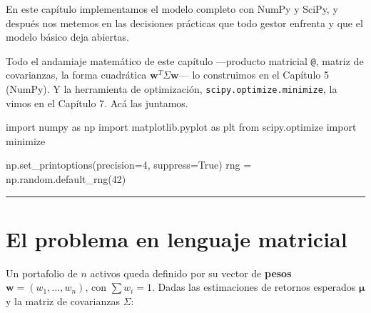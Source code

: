 \documentclass[
  spanish,
  letterpaper,
  DIV=11,
  numbers=noendperiod]{scrreprt}
\newenvironment{Shaded}{\begin{snugshade}}{\end{snugshade}}
\newcommand{\DecValTok}[1]{\textcolor[rgb]{0.68,0.00,0.00}{#1}}
\newcommand{\ImportTok}[1]{\textcolor[rgb]{0.00,0.46,0.62}{#1}}
\newcommand{\NormalTok}[1]{\textcolor[rgb]{0.00,0.23,0.31}{#1}}
\newcommand{\OperatorTok}[1]{\textcolor[rgb]{0.37,0.37,0.37}{#1}}
\newcommand{\VariableTok}[1]{\textcolor[rgb]{0.07,0.07,0.07}{#1}}
\begin{document}
En este capítulo implementamos el modelo completo con NumPy y SciPy, y
después nos metemos en las decisiones prácticas que todo gestor enfrenta
y que el modelo básico deja abiertas.

\begin{tcolorbox}[enhanced jigsaw, bottomrule=.15mm, colback=white, opacitybacktitle=0.6, arc=.35mm, toprule=.15mm, opacityback=0, breakable, titlerule=0mm, left=2mm, coltitle=black, colbacktitle=quarto-callout-note-color!10!white, colframe=quarto-callout-note-color-frame, leftrule=.75mm, toptitle=1mm, bottomtitle=1mm, title=\textcolor{quarto-callout-note-color}{\faInfo}\hspace{0.5em}{Lo que ya sabés}, rightrule=.15mm]

Todo el andamiaje matemático de este capítulo ---producto matricial
\texttt{@}, matriz de covarianzas, la forma cuadrática
\(\mathbf{w}^T\Sigma\mathbf{w}\)--- lo construimos en el Capítulo 5
(NumPy). Y la herramienta de optimización,
\texttt{scipy.optimize.minimize}, la vimos en el Capítulo 7. Acá las
juntamos.

\end{tcolorbox}

\label{setup}
\begin{Shaded}
\begin{Highlighting}[]
\ImportTok{import}\NormalTok{ numpy }\ImportTok{as}\NormalTok{ np}
\ImportTok{import}\NormalTok{ matplotlib.pyplot }\ImportTok{as}\NormalTok{ plt}
\ImportTok{from}\NormalTok{ scipy.optimize }\ImportTok{import}\NormalTok{ minimize}

\NormalTok{np.set\_printoptions(precision}\OperatorTok{=}\DecValTok{4}\NormalTok{, suppress}\OperatorTok{=}\VariableTok{True}\NormalTok{)}
\NormalTok{rng }\OperatorTok{=}\NormalTok{ np.random.default\_rng(}\DecValTok{42}\NormalTok{)}
\end{Highlighting}
\end{Shaded}

\begin{center}\rule{0.5\linewidth}{0.5pt}\end{center}

\chapter{El problema en lenguaje
matricial}\label{el-problema-en-lenguaje-matricial}

Un portafolio de \(n\) activos queda definido por su vector de
\textbf{pesos} \(\mathbf{w} = (w_1, \dots, w_n)\), con \(\sum w_i = 1\).
Dadas las estimaciones de retornos esperados \(\boldsymbol{\mu}\) y la
matriz de covarianzas \(\Sigma\):
\end{document}
